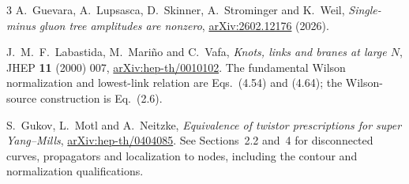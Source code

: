 \documentclass[11pt,letterpaper]{article}
\numberwithin{equation}{section}
\theoremstyle{definition}
\theoremstyle{remark}
\begin{document}
\begin{thebibliography}{3}
A.~Guevara, A.~Lupsasca, D.~Skinner, A.~Strominger and K.~Weil,
\emph{Single-minus gluon tree amplitudes are nonzero},
\href{https://arxiv.org/abs/2602.12176}{arXiv:2602.12176} (2026).

J.~M.~F.~Labastida, M.~Mari\~no and C.~Vafa,
\emph{Knots, links and branes at large $N$},
JHEP \textbf{11} (2000) 007,
\href{https://arxiv.org/abs/hep-th/0010102}{arXiv:hep-th/0010102}.
The fundamental Wilson normalization and lowest-link relation are
Eqs.~(4.54) and (4.64); the Wilson-source construction is Eq.~(2.6).

S.~Gukov, L.~Motl and A.~Neitzke,
\emph{Equivalence of twistor prescriptions for super Yang--Mills},
\href{https://arxiv.org/abs/hep-th/0404085}{arXiv:hep-th/0404085}.
See Sections~2.2 and~4 for disconnected curves, propagators and
localization to nodes, including the contour and normalization qualifications.
\end{thebibliography}
\end{document}
